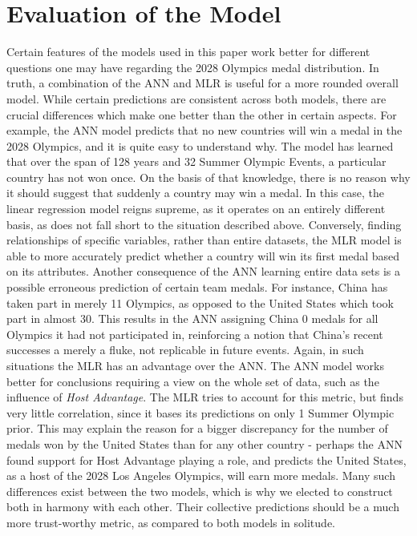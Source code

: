 \documentclass{mcmthesis}
\begin{document}
\section{Evaluation of the Model}
Certain features of the models used in this paper work better for different questions one may have regarding the 2028 Olympics medal distribution. In truth, a combination of the ANN and MLR is useful for a more rounded overall model. While certain predictions are consistent across both models, there are crucial differences which make one better than the other in certain aspects. For example, the ANN model predicts that no new countries will win a medal in the 2028 Olympics, and it is quite easy to understand why. The model has learned that over the span of 128 years and 32 Summer Olympic Events, a particular country has not won once. On the basis of that knowledge, there is no reason why it should suggest that suddenly a country may win a medal. In this case, the linear regression model reigns supreme, as it operates on an entirely different basis, as does not fall short to the situation described above. Conversely, finding relationships of specific variables, rather than entire datasets, the MLR model is able to more accurately predict whether a country will win its first medal based on its attributes. Another consequence of the ANN learning entire data sets is a possible erroneous prediction of certain team medals. For instance, China has taken part in merely 11 Olympics, as opposed to the United States which took part in almost 30. This results in the ANN assigning China 0 medals for all Olympics it had not participated in, reinforcing a notion that China's recent successes a merely a fluke, not replicable in future events. Again, in such situations the MLR has an advantage over the ANN. The ANN model works better for conclusions requiring a view on the whole set of data, such as the influence of \textit{Host Advantage}. The MLR tries to account for this metric, but finds very little correlation, since it bases its predictions on only 1 Summer Olympic prior. This may explain the reason for a bigger discrepancy for the number of medals won by the United States than for any other country - perhaps the ANN found support for Host Advantage playing a role, and predicts the United States, as a host of the 2028 Los Angeles Olympics, will earn more medals. Many such differences exist between the two models, which is why we elected to construct both in harmony with each other. Their collective predictions should be a much more trust-worthy metric, as compared to both models in solitude.
\end{document}
